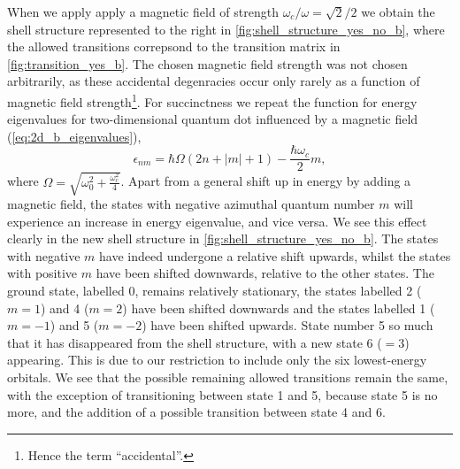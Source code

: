 When we apply apply a magnetic field of strength $\omega_c/\omega = \sqrt{2}/2$ we 
obtain the shell structure represented to the right in 
\autoref{fig:shell_structure_yes_no_b}, where the allowed transitions correpsond to the 
transition matrix in \autoref{fig:transition_yes_b}. The chosen magnetic field strength 
was not chosen arbitrarily, as these accidental degenracies occur only rarely as 
a function of magnetic field strength\footnote{Hence the term ``accidental''.}.
For succinctness we repeat the function for energy eigenvalues for two-dimensional 
quantum dot influenced by a magnetic field (\autoref{eq:2d_b_eigenvalues}),
\begin{equation}
    \epsilon_{nm} = \hbar\Omega(2n + |m| + 1) - \frac{\hbar\omega_c}{2}m,
\end{equation}
where $\Omega = \sqrt{\omega_0^2 + \frac{\omega_c^2}{4}}$.
Apart from a general shift up in energy by adding a magnetic field, the states with 
negative azimuthal quantum number $m$ will experience an increase in energy eigenvalue,
and vice versa. We see this effect clearly in the new shell structure in
\autoref{fig:shell_structure_yes_no_b}. The states with negative $m$ have indeed
undergone a relative shift upwards, whilst the states with positive $m$ have been
shifted downwards, relative to the other states. The ground state, labelled 0, 
remains relatively stationary, the states labelled 2 ($m=1$) and 4 ($m=2$) have been 
shifted downwards and the states labelled 1 ($m=-1$) and 5 ($m=-2$) have been shifted 
upwards. State number 5 so much that it has disappeared from the shell structure, with a 
new state 6 ($=3$) appearing. This is due to our restriction to include only the six
lowest-energy orbitals. We see that the possible remaining allowed transitions remain the 
same, with the exception of transitioning between state 1 and 5, because state 5 is no more,
and the addition of a possible transition between state 4 and 6.


